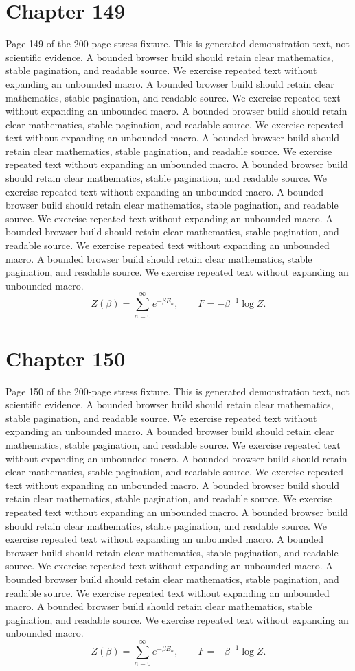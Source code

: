 \documentclass[11pt]{article}
\begin{document}
\section*{Chapter 149}
Page 149 of the 200-page stress fixture. This is generated demonstration text, not scientific evidence.
A bounded browser build should retain clear mathematics, stable pagination, and readable source. We exercise repeated text without expanding an unbounded macro.
A bounded browser build should retain clear mathematics, stable pagination, and readable source. We exercise repeated text without expanding an unbounded macro.
A bounded browser build should retain clear mathematics, stable pagination, and readable source. We exercise repeated text without expanding an unbounded macro.
A bounded browser build should retain clear mathematics, stable pagination, and readable source. We exercise repeated text without expanding an unbounded macro.
A bounded browser build should retain clear mathematics, stable pagination, and readable source. We exercise repeated text without expanding an unbounded macro.
A bounded browser build should retain clear mathematics, stable pagination, and readable source. We exercise repeated text without expanding an unbounded macro.
A bounded browser build should retain clear mathematics, stable pagination, and readable source. We exercise repeated text without expanding an unbounded macro.
A bounded browser build should retain clear mathematics, stable pagination, and readable source. We exercise repeated text without expanding an unbounded macro.
\[Z(\beta)=\sum_{n=0}^{\infty}e^{-\beta E_n},\qquad F=-\beta^{-1}\log Z.\]
\newpage
\section*{Chapter 150}
Page 150 of the 200-page stress fixture. This is generated demonstration text, not scientific evidence.
A bounded browser build should retain clear mathematics, stable pagination, and readable source. We exercise repeated text without expanding an unbounded macro.
A bounded browser build should retain clear mathematics, stable pagination, and readable source. We exercise repeated text without expanding an unbounded macro.
A bounded browser build should retain clear mathematics, stable pagination, and readable source. We exercise repeated text without expanding an unbounded macro.
A bounded browser build should retain clear mathematics, stable pagination, and readable source. We exercise repeated text without expanding an unbounded macro.
A bounded browser build should retain clear mathematics, stable pagination, and readable source. We exercise repeated text without expanding an unbounded macro.
A bounded browser build should retain clear mathematics, stable pagination, and readable source. We exercise repeated text without expanding an unbounded macro.
A bounded browser build should retain clear mathematics, stable pagination, and readable source. We exercise repeated text without expanding an unbounded macro.
A bounded browser build should retain clear mathematics, stable pagination, and readable source. We exercise repeated text without expanding an unbounded macro.
\[Z(\beta)=\sum_{n=0}^{\infty}e^{-\beta E_n},\qquad F=-\beta^{-1}\log Z.\]
\newpage
\end{document}

